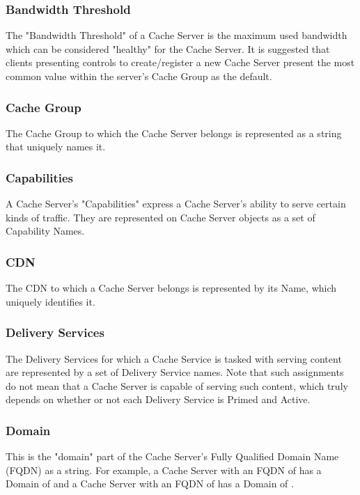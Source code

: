 \subsubsection{Bandwidth Threshold}
The "Bandwidth Threshold" of a Cache Server is the maximum used bandwidth which
can be considered "healthy" for the Cache Server. It is suggested that clients
presenting controls to create/register a new Cache Server present the most common
value within the server's Cache Group as the default.

\subsubsection{Cache Group}
The Cache Group to which the Cache Server belongs is represented as a string that
uniquely names it.

\subsubsection{Capabilities}
A Cache Server's "Capabilities" express a Cache Server's ability to serve certain
kinds of traffic. They are represented on Cache Server objects as a set of
Capability Names.

\subsubsection{CDN}
The CDN to which a Cache Server belongs is represented by its Name, which
uniquely identifies it.

\subsubsection{Delivery Services}
The Delivery Services for which a Cache Service is tasked with serving content
are represented by a set of Delivery Service names. Note that such assignments do
not mean that a Cache Server is capable of serving such content, which truly
depends on whether or not each Delivery Service is Primed and Active.

\subsubsection{Domain}
This is the "domain" part of the Cache Server's Fully Qualified Domain Name
(FQDN) as a string. For example, a Cache Server with an FQDN of 
has a Domain of  and a Cache Server with an FQDN of
 has a Domain of .

